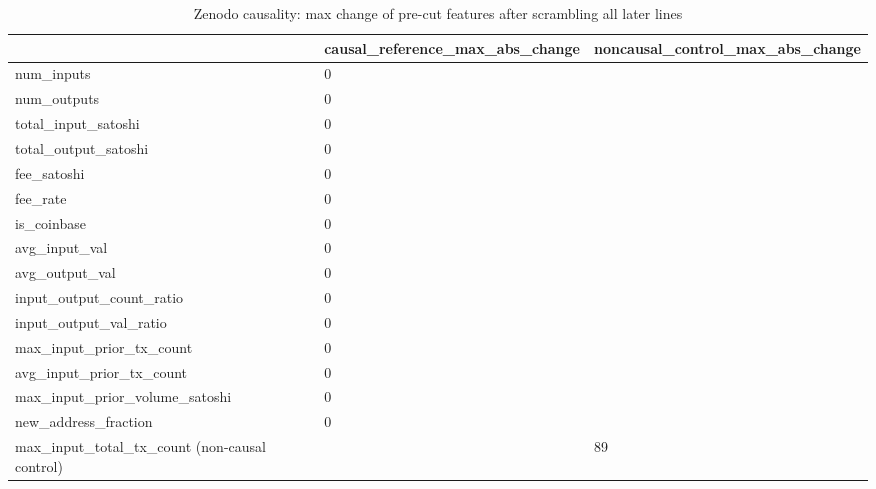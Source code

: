\begin{table}
\caption{Zenodo causality: max change of pre-cut features after scrambling all later lines}
\label{tab:01A_zenodo_causality}
\begin{tabular}{lll}
\toprule
 & causal\_reference\_max\_abs\_change & noncausal\_control\_max\_abs\_change \\
\midrule
num\_inputs & 0 &  \\
num\_outputs & 0 &  \\
total\_input\_satoshi & 0 &  \\
total\_output\_satoshi & 0 &  \\
fee\_satoshi & 0 &  \\
fee\_rate & 0 &  \\
is\_coinbase & 0 &  \\
avg\_input\_val & 0 &  \\
avg\_output\_val & 0 &  \\
input\_output\_count\_ratio & 0 &  \\
input\_output\_val\_ratio & 0 &  \\
max\_input\_prior\_tx\_count & 0 &  \\
avg\_input\_prior\_tx\_count & 0 &  \\
max\_input\_prior\_volume\_satoshi & 0 &  \\
new\_address\_fraction & 0 &  \\
max\_input\_total\_tx\_count (non-causal control) &  & 89 \\
\bottomrule
\end{tabular}
\end{table}
